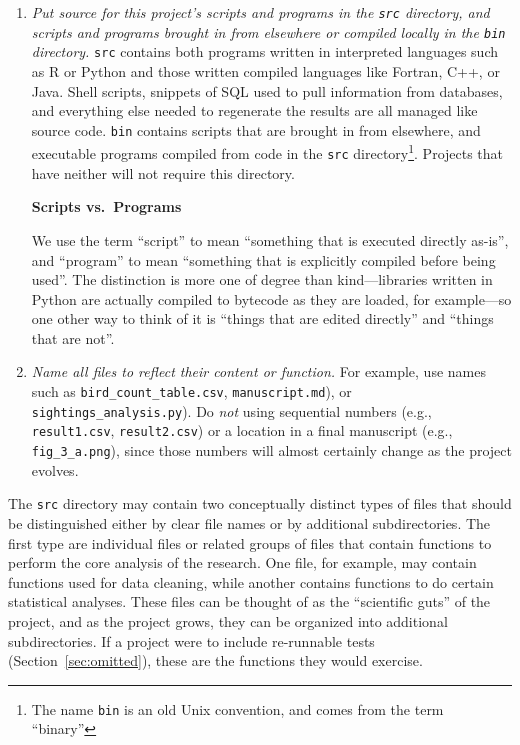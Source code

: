 \documentclass[10pt]{article}
\newcommand{\recommend}[1]{\textit{#1}}
\begin{document}
\begin{enumerate}
\item
  \recommend{Put source for this project's scripts and programs in the
    \texttt{src} directory, and scripts and programs brought in from
    elsewhere or compiled locally in the \texttt{bin} directory.}
  \texttt{src} contains both programs written in interpreted languages
  such as R or Python and those written compiled languages like
  Fortran, C++, or Java. Shell scripts, snippets of SQL used to pull
  information from databases, and everything else needed to regenerate
  the results are all managed like source code.  \texttt{bin} contains
  scripts that are brought in from elsewhere, and executable programs
  compiled from code in the \texttt{src} directory\footnote{The name
    \texttt{bin} is an old Unix convention, and comes from the term
    ``binary''}. Projects that have neither will not require this
  directory.

  \begin{framed}
    \noindent \textbf{Scripts vs.\ Programs}

    We use the term ``script'' to mean ``something that is executed
    directly as-is'', and ``program'' to mean ``something that is
    explicitly compiled before being used''.  The distinction is more
    one of degree than kind---libraries written in Python are actually
    compiled to bytecode as they are loaded, for example---so one
    other way to think of it is ``things that are edited directly''
    and ``things that are not''.
  \end{framed}

\item
  \recommend{Name all files to reflect their content or function.} For
  example, use names such as \texttt{bird\_count\_table.csv},
  \texttt{manuscript.md}), or \texttt{sightings\_analysis.py}).  Do
  \emph{not} using sequential numbers (e.g., \texttt{result1.csv},
  \texttt{result2.csv}) or a location in a final manuscript (e.g.,
  \texttt{fig\_3\_a.png}), since those numbers will almost certainly
  change as the project evolves.
  
\end{enumerate}

The \texttt{src} directory may contain two conceptually distinct types
of files that should be distinguished either by clear file names or by
additional subdirectories. The first type are individual files or
related groups of files that contain functions to perform the core
analysis of the research. One file, for example, may contain functions
used for data cleaning, while another contains functions to do certain
statistical analyses. These files can be thought of as the
``scientific guts'' of the project, and as the project grows, they can
be organized into additional subdirectories. If a project were to
include re-runnable tests (Section~\ref{sec:omitted}), these are the
functions they would exercise.
  
\end{document}
